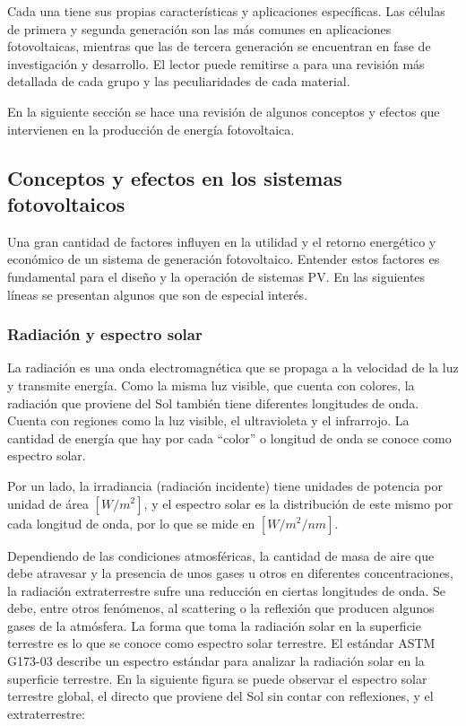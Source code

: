 Cada una tiene sus propias características y aplicaciones específicas. Las células de primera y segunda generación son las más comunes en aplicaciones fotovoltaicas, mientras que las de tercera generación se encuentran en fase de investigación y desarrollo. El lector puede remitirse a \cite{Shubbak_2019} para una revisión más detallada de cada grupo y las peculiaridades de cada material.

En la siguiente sección se hace una revisión de algunos conceptos y efectos que intervienen en la producción de energía fotovoltaica.

\subsection{Conceptos y efectos en los sistemas fotovoltaicos}

Una gran cantidad de factores influyen en la utilidad y el retorno energético y económico de un sistema de generación fotovoltaico. Entender estos factores es fundamental para el diseño y la operación de sistemas PV. En las siguientes líneas se presentan algunos que son de especial interés.

\subsubsection{Radiación y espectro solar}

La radiación es una onda electromagnética que se propaga a la velocidad de la luz y transmite energía. Como la misma luz visible, que cuenta con colores, la radiación que proviene del Sol también tiene diferentes longitudes de onda. Cuenta con regiones como la luz visible, el \gls{ultravioleta} y el \gls{infrarrojo}. La cantidad de energía que hay por cada ``color'' o \gls{longitud de onda} se conoce como espectro solar.

Por un lado, la \gls{irradiancia} (radiación incidente) tiene unidades de potencia por unidad de área $[W/m^2]$, y el espectro solar es la distribución de este mismo por cada \gls{longitud de onda}, por lo que se mide en $[W/m^2/nm]$.

Dependiendo de las condiciones atmosféricas, la cantidad de masa de aire que debe atravesar y la presencia de unos gases u otros en diferentes concentraciones, la \gls{radiación extraterrestre} sufre una reducción en ciertas longitudes de onda. Se debe, entre otros fenómenos, al scattering o la reflexión que producen algunos gases de la atmósfera. La forma que toma la \gls{radiación solar} en la superficie terrestre es lo que se conoce como espectro solar terrestre. El \gls{estándar} ASTM G173-03 \cite{astm_g173-03} describe un \gls{espectro estándar} para analizar la radiación solar en la superficie terrestre. En la siguiente figura se puede observar el espectro solar terrestre global, el directo que proviene del Sol sin contar con reflexiones, y el extraterrestre:

